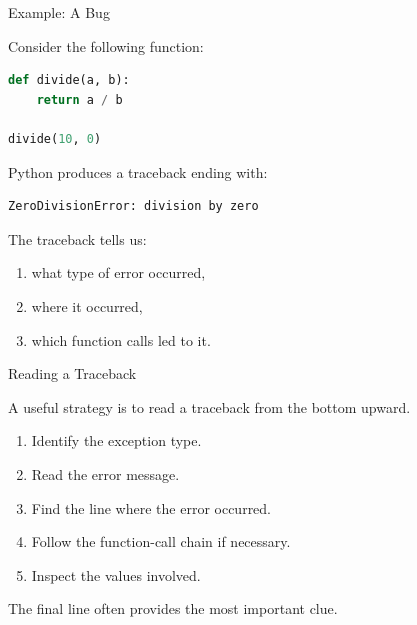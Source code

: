 \documentclass[aspectratio=43,10pt]{beamer}
\begin{document}
\begin{frame}[fragile]{Example: A Bug}

Consider the following function:

\begin{lstlisting}[language=Python]
def divide(a, b):
    return a / b

divide(10, 0)
\end{lstlisting}

Python produces a traceback ending with:

\begin{lstlisting}
ZeroDivisionError: division by zero
\end{lstlisting}

The traceback tells us:

\begin{enumerate}
  \item what type of error occurred,
  \item where it occurred,
  \item which function calls led to it.
\end{enumerate}

\end{frame}

\begin{frame}{Reading a Traceback}

A useful strategy is to read a traceback from the bottom upward.

\begin{enumerate}
  \item Identify the exception type.
  \item Read the error message.
  \item Find the line where the error occurred.
  \item Follow the function-call chain if necessary.
  \item Inspect the values involved.
\end{enumerate}

\vspace{0.3cm}

The final line often provides the most important clue.

\end{frame}
\end{document}
